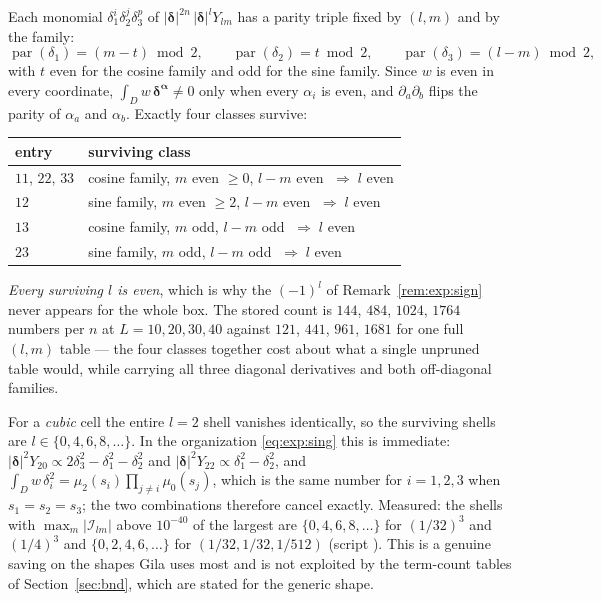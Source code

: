 Each monomial $\delta_1^{i}\delta_2^{j}\delta_3^{p}$ of
$|\boldsymbol{\delta}|^{2n}\,|\boldsymbol{\delta}|^{l}Y_{lm}$ has a parity triple fixed by
$(l,m)$ and by the family:
\begin{equation}
\operatorname{par}(\delta_1) = (m-t)\bmod 2,\qquad
\operatorname{par}(\delta_2) = t \bmod 2,\qquad
\operatorname{par}(\delta_3) = (l-m)\bmod 2,
\label{eq:exp:par}
\end{equation}
with $t$ even for the cosine family and odd for the sine family. Since $w$ is even in
every coordinate, $\int_D w\,\boldsymbol{\delta}^{\boldsymbol{\alpha}} \neq 0$ only when
every $\alpha_i$ is even, and $\partial_a\partial_b$ flips the parity of $\alpha_a$ and
$\alpha_b$. Exactly four classes survive:
\begin{center}\small
\begin{tabular}{@{}ll@{}}
\toprule
entry & surviving class\\
\midrule
$11$, $22$, $33$ & cosine family, $m$ even $\ge 0$, $l-m$ even $\;\Rightarrow\; l$ even\\
$12$ & sine family, $m$ even $\ge 2$, $l-m$ even $\;\Rightarrow\; l$ even\\
$13$ & cosine family, $m$ odd, $l-m$ odd $\;\Rightarrow\; l$ even\\
$23$ & sine family, $m$ odd, $l-m$ odd $\;\Rightarrow\; l$ even\\
\bottomrule
\end{tabular}
\end{center}
\noindent
\emph{Every surviving $l$ is even}, which is why the $(-1)^l$ of
Remark~\ref{rem:exp:sign} never appears for the whole box. The stored count is $144$,
$484$, $1024$, $1764$ numbers per $n$ at $L = 10, 20, 30, 40$ against $121$, $441$,
$961$, $1681$ for one full $(l,m)$ table --- the four classes together cost about what a
single unpruned table would, while carrying all three diagonal derivatives and both
off-diagonal families.

\begin{remark}[the cube loses $l=2$ as well]
\label{rem:exp:l2}
For a \emph{cubic} cell the entire $l=2$ shell vanishes identically, so the surviving
shells are $l \in \{0,4,6,8,\dots\}$. In the organization \eqref{eq:exp:sing} this is
immediate: $|\boldsymbol{\delta}|^2Y_{20} \propto 2\delta_3^2-\delta_1^2-\delta_2^2$ and
$|\boldsymbol{\delta}|^2Y_{22} \propto \delta_1^2-\delta_2^2$, and
$\int_D w\,\delta_i^2 = \mu_2(s_i)\prod_{j\neq i}\mu_0(s_j)$, which is the same number for
$i=1,2,3$ when $s_1=s_2=s_3$; the two combinations therefore cancel exactly. Measured:
the shells with $\max_m|\mathcal{I}_{lm}|$ above $10^{-40}$ of the largest are
$\{0,4,6,8,\dots\}$ for $(1/32)^3$ and $(1/4)^3$ and $\{0,2,4,6,\dots\}$ for
$(1/32,1/32,1/512)$ (script ). This is a genuine saving on the shapes
Gila uses most and is not exploited by the term-count tables of
Section~\ref{sec:bnd}, which are stated for the generic shape.
\end{remark}

